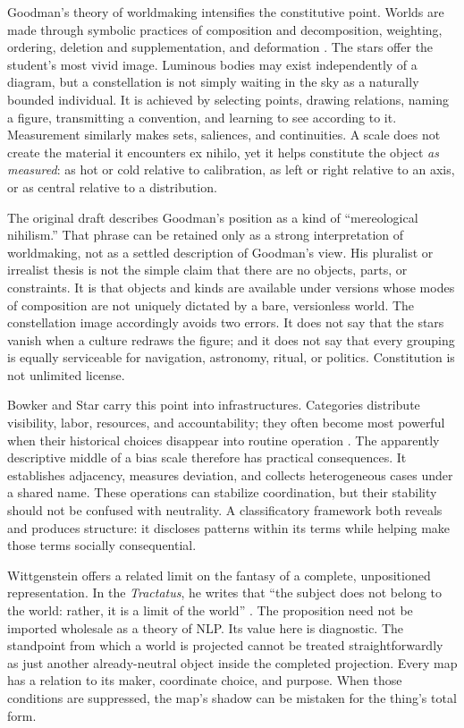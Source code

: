 Goodman's theory of worldmaking intensifies the constitutive point. Worlds are made through symbolic practices of composition and decomposition, weighting, ordering, deletion and supplementation, and deformation \citep{goodman1978}. The stars offer the student's most vivid image. Luminous bodies may exist independently of a diagram, but a constellation is not simply waiting in the sky as a naturally bounded individual. It is achieved by selecting points, drawing relations, naming a figure, transmitting a convention, and learning to see according to it. Measurement similarly makes sets, saliences, and continuities. A scale does not create the material it encounters ex nihilo, yet it helps constitute the object \emph{as measured}: as hot or cold relative to calibration, as left or right relative to an axis, or as central relative to a distribution.

The original draft describes Goodman's position as a kind of ``mereological nihilism.'' That phrase can be retained only as a strong interpretation of worldmaking, not as a settled description of Goodman's view. His pluralist or irrealist thesis is not the simple claim that there are no objects, parts, or constraints. It is that objects and kinds are available under versions whose modes of composition are not uniquely dictated by a bare, versionless world. The constellation image accordingly avoids two errors. It does not say that the stars vanish when a culture redraws the figure; and it does not say that every grouping is equally serviceable for navigation, astronomy, ritual, or politics. Constitution is not unlimited license.

Bowker and Star carry this point into infrastructures. Categories distribute visibility, labor, resources, and accountability; they often become most powerful when their historical choices disappear into routine operation \citep{bowkerstar1999}. The apparently descriptive middle of a bias scale therefore has practical consequences. It establishes adjacency, measures deviation, and collects heterogeneous cases under a shared name. These operations can stabilize coordination, but their stability should not be confused with neutrality. A classificatory framework both reveals and produces structure: it discloses patterns within its terms while helping make those terms socially consequential.

Wittgenstein offers a related limit on the fantasy of a complete, unpositioned representation. In the \emph{Tractatus}, he writes that ``the subject does not belong to the world: rather, it is a limit of the world'' \citep[\S5.632]{wittgenstein1922}. The proposition need not be imported wholesale as a theory of NLP. Its value here is diagnostic. The standpoint from which a world is projected cannot be treated straightforwardly as just another already-neutral object inside the completed projection. Every map has a relation to its maker, coordinate choice, and purpose. When those conditions are suppressed, the map's shadow can be mistaken for the thing's total form.

